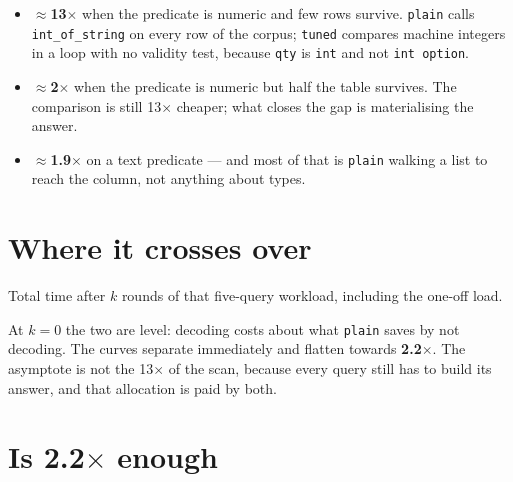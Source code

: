 \documentclass[11pt,a4paper]{article}
\begin{document}
\begin{itemize}[leftmargin=1.4em]
\item \textbf{$\approx$13$\times$} when the predicate is numeric and few rows survive.
  \texttt{plain} calls \texttt{int\_of\_string} on every row of the corpus; \texttt{tuned}
  compares machine integers in a loop with no validity test, because \texttt{qty} is
  \texttt{int} and not \texttt{int option}.
\item \textbf{$\approx$2$\times$} when the predicate is numeric but half the table
  survives. The comparison is still 13$\times$ cheaper; what closes the gap is
  materialising the answer.
\item \textbf{$\approx$1.9$\times$} on a text predicate --- and most of that is
  \texttt{plain} walking a list to reach the column, not anything about types.
\end{itemize}

\section{Where it crosses over}
\label{sec:cross}

Total time after $k$ rounds of that five-query workload, including the one-off load.

\begin{center}
\end{center}

At $k=0$ the two are level: decoding costs about what \texttt{plain} saves by not
decoding. The curves separate immediately and flatten towards \textbf{2.2$\times$}. The
asymptote is not the 13$\times$ of the scan, because every query still has to build its
answer, and that allocation is paid by both.

\section{Is 2.2$\times$ enough}
\label{sec:enough}
\end{document}
